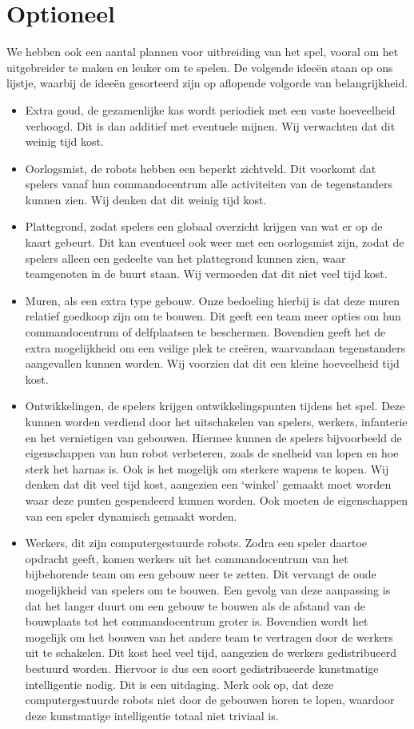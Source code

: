 \section{Optioneel}
We hebben ook een aantal plannen voor uitbreiding van het spel, vooral om het uitgebreider te maken en leuker om te spelen. De volgende idee\"en staan op ons lijstje, waarbij de idee\"en gesorteerd zijn op aflopende volgorde van belangrijkheid.

\begin{itemize}
  \item Extra goud, de gezamenlijke kas wordt periodiek met een vaste hoeveelheid verhoogd. Dit is dan additief met eventuele mijnen. Wij verwachten dat dit weinig tijd kost.
  \item Oorlogsmist, de robots hebben een beperkt zichtveld. Dit voorkomt dat spelers vanaf hun commandocentrum alle activiteiten van de tegenstanders kunnen zien. Wij denken dat dit weinig tijd kost.
  \item Plattegrond, zodat spelers een globaal overzicht krijgen van wat er op de kaart gebeurt. Dit kan eventueel ook weer met een oorlogsmist zijn, zodat de spelers alleen een gedeelte van het plattegrond kunnen zien, waar teamgenoten in de buurt staan. Wij vermoeden dat dit niet veel tijd kost.
  \item Muren, als een extra type gebouw. Onze bedoeling hierbij is dat deze muren relatief goedkoop zijn om te bouwen. Dit geeft een team meer opties om hun commandocentrum of delfplaatsen te beschermen. Bovendien geeft het de extra mogelijkheid om een veilige plek te cre\"eren, waarvandaan tegenstanders aangevallen kunnen worden. Wij voorzien dat dit een kleine hoeveelheid tijd kost.
  \item Ontwikkelingen, de spelers krijgen ontwikkelingspunten tijdens het spel. Deze kunnen worden verdiend door het uitschakelen van spelers, werkers, infanterie en het vernietigen van gebouwen. Hiermee kunnen de spelers bijvoorbeeld de eigenschappen van hun robot verbeteren, zoals de snelheid van lopen en hoe sterk het harnas is. Ook is het mogelijk om sterkere wapens te kopen. Wij denken dat dit veel tijd kost, aangezien een `winkel' gemaakt moet worden waar deze punten gespendeerd kunnen worden. Ook moeten de eigenschappen van een speler dynamisch gemaakt worden.
  \item Werkers, dit zijn computergestuurde robots. Zodra een speler daartoe opdracht geeft, komen werkers uit het commandocentrum van het bijbehorende team om een gebouw neer te zetten. Dit vervangt de oude mogelijkheid van spelers om te bouwen. Een gevolg van deze aanpassing is dat het langer duurt om een gebouw te bouwen als de afstand van de bouwplaats tot het commandocentrum groter is. Bovendien wordt het mogelijk om het bouwen van het andere team te vertragen door de werkers uit te schakelen. Dit kost heel veel tijd, aangezien de werkers gedistribueerd bestuurd worden. Hiervoor is dus een soort gedistribueerde kunstmatige intelligentie nodig. Dit is een uitdaging. Merk ook op, dat deze computergestuurde robots niet door de gebouwen horen te lopen, waardoor deze kunstmatige intelligentie totaal niet triviaal is.

\end{itemize}
